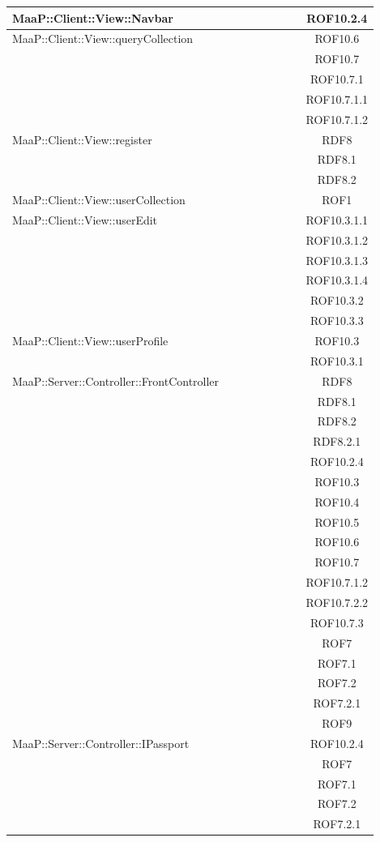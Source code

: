 \begin{center}
\begin{longtable}{|p{0.8\linewidth}|c|}
\midrule
MaaP::Client::View::Navbar
& ROF10.2.4\\

\midrule
MaaP::Client::View::queryCollection
& ROF10.6\\
& ROF10.7\\
& ROF10.7.1\\
& ROF10.7.1.1\\
& ROF10.7.1.2\\

\midrule
MaaP::Client::View::register
& RDF8\\
& RDF8.1\\
& RDF8.2\\

\midrule
MaaP::Client::View::userCollection
& ROF1\\

\midrule
MaaP::Client::View::userEdit
& ROF10.3.1.1\\
& ROF10.3.1.2\\
& ROF10.3.1.3\\
& ROF10.3.1.4\\
& ROF10.3.2\\
& ROF10.3.3\\

\midrule
MaaP::Client::View::userProfile
& ROF10.3\\
& ROF10.3.1\\

\midrule
MaaP::Server::Controller::FrontController
& RDF8\\
& RDF8.1\\
& RDF8.2\\
& RDF8.2.1\\
& ROF10.2.4\\
& ROF10.3\\
& ROF10.4\\
& ROF10.5\\
& ROF10.6\\
& ROF10.7\\
& ROF10.7.1.2\\
& ROF10.7.2.2\\
& ROF10.7.3\\
& ROF7\\
& ROF7.1\\
& ROF7.2\\
& ROF7.2.1\\
& ROF9\\

\midrule
MaaP::Server::Controller::IPassport
& ROF10.2.4\\
& ROF7\\
& ROF7.1\\
& ROF7.2\\
& ROF7.2.1\\


\end{longtable}
\end{center}
